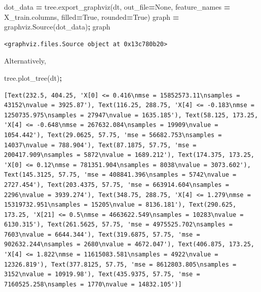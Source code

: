 \documentclass[
  letterpaper,
]{scrbook}
\newenvironment{Shaded}{\begin{snugshade}}{\end{snugshade}}
\newcommand{\NormalTok}[1]{#1}
\newcommand{\OperatorTok}[1]{\textcolor[rgb]{0.81,0.36,0.00}{\textbf{#1}}}
\newcommand{\VariableTok}[1]{\textcolor[rgb]{0.00,0.00,0.00}{#1}}
\begin{document}
\begin{Shaded}
\begin{Highlighting}[]
\NormalTok{dot_data }\OperatorTok{=}\NormalTok{ tree.export_graphviz(dt, out_file}\OperatorTok{=}\VariableTok{None}\NormalTok{, }
\NormalTok{                                feature_names }\OperatorTok{=}\NormalTok{ X_train.columns,}
\NormalTok{                                filled}\OperatorTok{=}\VariableTok{True}\NormalTok{, rounded}\OperatorTok{=}\VariableTok{True}\NormalTok{)}
\NormalTok{graph }\OperatorTok{=}\NormalTok{ graphviz.Source(dot_data)}\OperatorTok{;}
\NormalTok{graph}
\end{Highlighting}
\end{Shaded}

\begin{verbatim}
<graphviz.files.Source object at 0x13c780b20>
\end{verbatim}

Alternatively,

\begin{Shaded}
\begin{Highlighting}[]
\NormalTok{tree.plot_tree(dt)}\OperatorTok{;}
\end{Highlighting}
\end{Shaded}

\begin{verbatim}
[Text(232.5, 404.25, 'X[0] <= 0.416\nmse = 15852573.11\nsamples = 43152\nvalue = 3925.87'), Text(116.25, 288.75, 'X[4] <= -0.183\nmse = 1250735.975\nsamples = 27947\nvalue = 1635.185'), Text(58.125, 173.25, 'X[4] <= -0.648\nmse = 267632.084\nsamples = 19909\nvalue = 1054.442'), Text(29.0625, 57.75, 'mse = 56682.753\nsamples = 14037\nvalue = 788.904'), Text(87.1875, 57.75, 'mse = 200417.909\nsamples = 5872\nvalue = 1689.212'), Text(174.375, 173.25, 'X[0] <= 0.12\nmse = 781351.904\nsamples = 8038\nvalue = 3073.602'), Text(145.3125, 57.75, 'mse = 408841.396\nsamples = 5742\nvalue = 2727.454'), Text(203.4375, 57.75, 'mse = 663914.604\nsamples = 2296\nvalue = 3939.274'), Text(348.75, 288.75, 'X[4] <= 1.279\nmse = 15319732.951\nsamples = 15205\nvalue = 8136.181'), Text(290.625, 173.25, 'X[21] <= 0.5\nmse = 4663622.549\nsamples = 10283\nvalue = 6130.315'), Text(261.5625, 57.75, 'mse = 4975525.702\nsamples = 7603\nvalue = 6644.344'), Text(319.6875, 57.75, 'mse = 902632.244\nsamples = 2680\nvalue = 4672.047'), Text(406.875, 173.25, 'X[4] <= 1.822\nmse = 11615083.581\nsamples = 4922\nvalue = 12326.819'), Text(377.8125, 57.75, 'mse = 8612803.805\nsamples = 3152\nvalue = 10919.98'), Text(435.9375, 57.75, 'mse = 7160525.258\nsamples = 1770\nvalue = 14832.105')]
\end{verbatim}
\end{document}
